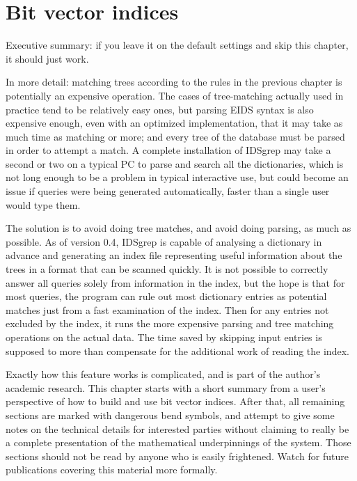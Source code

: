 \documentclass[twocolumn]{report}
\begin{document}

\chapter{Bit vector indices}

\noindent

Executive summary:  if you leave it on the default settings and skip this
chapter, it should just work.

In more detail:  matching trees according to the rules in the previous
chapter is potentially an expensive operation.  The cases of tree-matching
actually used in practice tend to be relatively easy ones, but parsing EIDS
syntax is also expensive enough, even with an optimized implementation, that
it may take as much time as matching or more; and every tree of the database
must be parsed in order to attempt a match.  A complete installation of
IDSgrep may take a second or two on a typical PC to parse and search all the
dictionaries, which is not long enough to be a problem in typical
interactive use, but could become an issue if queries were being generated
automatically, faster than a single user would type them.

The solution is to avoid doing tree matches, and avoid doing parsing, as
much as possible.  As of version 0.4, IDSgrep is capable of analysing a
dictionary in advance and generating an index file representing useful
information about the trees in a format that can be scanned quickly.  It is
not possible to correctly answer all queries solely from information in the
index, but the hope is that for most queries, the program can rule out most
dictionary entries as potential matches just from a fast examination of the
index.  Then for any entries not excluded by the index, it runs the more
expensive parsing and tree matching operations on the actual data.  The time
saved by skipping input entries is supposed to more than compensate for the
additional work of reading the index.

Exactly how this feature works is complicated, and is part of the author's
academic research.  This chapter starts with a short summary from a user's
perspective of how to build and use bit vector indices.  After that, all
remaining sections are marked with dangerous bend symbols, and attempt to
give some notes on the technical details for interested parties without
claiming to really be a complete presentation of the mathematical
underpinnings of the system.  Those sections should not be read by anyone
who is easily frightened.  Watch for future publications covering this
material more formally.
\end{document}
